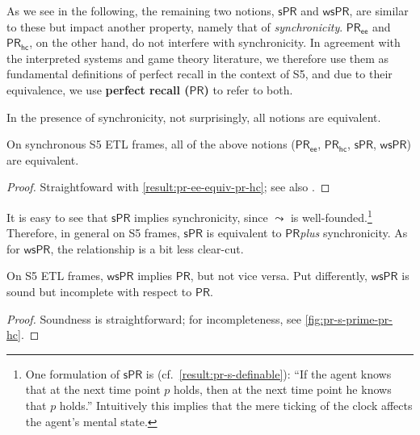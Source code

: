 \documentclass{article}
\newcommand{\PR}{\ensuremath{\mathsf{PR}}\xspace}
\newcommand{\PRs}{\ensuremath{\mathsf{sPR}}\xspace}
\newcommand{\PRsprime}{\ensuremath{\mathsf{wsPR}}\xspace}
\newcommand{\PRhc}{\ensuremath{\mathsf{PR_{hc}}}\xspace}
\newcommand{\PRee}{\ensuremath{\mathsf{PR_{ee}}}\xspace}
\def\dfn{\textbf}
\newcounter{#1}
\begin{document}
As we see in the following, the remaining two notions, \PRs and \PRsprime,
are similar to these but impact another property,
namely that of \emph{synchronicity}.
\PRee and \PRhc, on the other hand, do not interfere with synchronicity.
In agreement with the interpreted systems and game theory literature,
we therefore use them as fundamental definitions of perfect recall in the context of S5,
and due to their equivalence, we use \dfn{perfect recall (\PR)} to refer to both.

\medskip

In the presence of synchronicity, not surprisingly, all notions are equivalent.

\begin{proposition}
  \label{result:sync-pr-ee-equiv-pr-s}
  On synchronous S5 ETL frames, all of the above notions (\PRee, \PRhc, \PRs, \PRsprime) are equivalent.
\end{proposition}
\begin{proof}
  Straightfoward with \cref{result:pr-ee-equiv-pr-hc};
  see also \cite{halpern_complete_2004,van_der_meyden_complete_2003}.
\end{proof}

It is easy to see that \PRs implies synchronicity,
since $\leadsto$ is well-founded.\footnote{One formulation of $\PRs$ is (cf.~\cref{result:pr-s-definable}):
``If the agent knows that at the next time point $p$ holds, then at the next time point he knows that $p$ holds.''
Intuitively this implies that the mere ticking of the clock affects the agent's mental state.}
Therefore, in general on S5 frames, \PRs is equivalent to \PR \emph{plus} synchronicity.
As for \PRsprime, the relationship is a bit less clear-cut.

\begin{proposition}
  On S5 ETL frames, \PRsprime implies \PR, but not vice versa.
  Put differently, \PRsprime is sound but incomplete with respect to \PR.
\end{proposition}
\begin{proof}
  Soundness is straightforward;
  for incompleteness, see \cref{fig:pr-s-prime-pr-hc}.
\end{proof}
\end{document}
